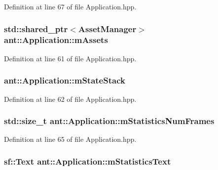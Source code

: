 Definition at line 67 of file Application.\+hpp.

\hypertarget{classant_1_1_application_a8a884f6f63b2ed9928543ce493e3bc2c}{
\subsubsection[{m\+Assets}]{\setlength{\rightskip}{0pt plus 5cm}std\+::shared\+\_\+ptr$<${\bf Asset\+Manager}$>$ ant\+::\+Application\+::m\+Assets\hspace{0.3cm}{\ttfamily [private]}}}\label{classant_1_1_application_a8a884f6f63b2ed9928543ce493e3bc2c}


Definition at line 61 of file Application.\+hpp.

\hypertarget{classant_1_1_application_affce09adbc792733866c8a45d7d9bda8}{
\subsubsection[{m\+State\+Stack}]{ ant\+::\+Application\+::m\+State\+Stack\hspace{0.3cm}{\ttfamily [private]}}}\label{classant_1_1_application_affce09adbc792733866c8a45d7d9bda8}


Definition at line 62 of file Application.\+hpp.

\hypertarget{classant_1_1_application_aaba4dc5709cab5ea4e77b27e5f5fb9e4}{
\subsubsection[{m\+Statistics\+Num\+Frames}]{\setlength{\rightskip}{0pt plus 5cm}std\+::size\+\_\+t ant\+::\+Application\+::m\+Statistics\+Num\+Frames\hspace{0.3cm}{\ttfamily [private]}}}\label{classant_1_1_application_aaba4dc5709cab5ea4e77b27e5f5fb9e4}


Definition at line 65 of file Application.\+hpp.

\hypertarget{classant_1_1_application_ac6efeaf0017a5847c404d569134bdb17}{
\subsubsection[{m\+Statistics\+Text}]{\setlength{\rightskip}{0pt plus 5cm}sf\+::\+Text ant\+::\+Application\+::m\+Statistics\+Text\hspace{0.3cm}{\ttfamily [private]}}}\label{classant_1_1_application_ac6efeaf0017a5847c404d569134bdb17}


